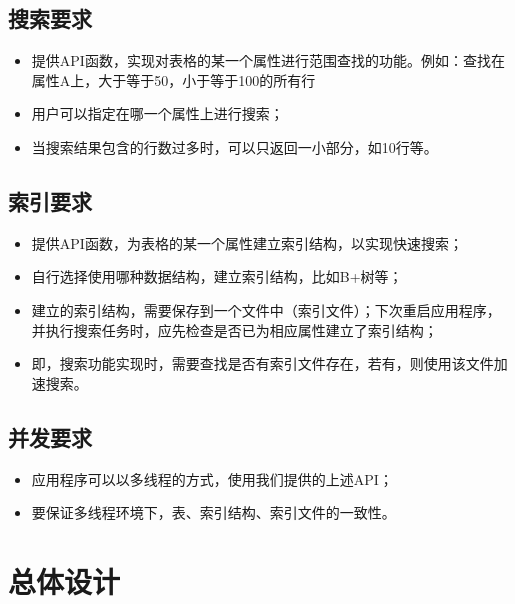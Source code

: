 \documentclass[bachelor]{thesis-uestc}
\begin{document}
\section{搜索要求}
\begin{itemize}
	\item 提供API函数，实现对表格的某一个属性进行范围查找的功能。例如：查找在属性A上，大于等于50，小于等于100的所有行
	\item 用户可以指定在哪一个属性上进行搜索；
	\item 当搜索结果包含的行数过多时，可以只返回一小部分，如10行等。
\end{itemize}

\section{索引要求}
\begin{itemize}
	\item 提供API函数，为表格的某一个属性建立索引结构，以实现快速搜索；
	\item 自行选择使用哪种数据结构，建立索引结构，比如B+树等；
	\item 建立的索引结构，需要保存到一个文件中（索引文件）；下次重启应用程序，并执行搜索任务时，应先检查是否已为相应属性建立了索引结构；
	\item 即，搜索功能实现时，需要查找是否有索引文件存在，若有，则使用该文件加速搜索。	
\end{itemize}

\section{并发要求}
\begin{itemize}
	\item 应用程序可以以多线程的方式，使用我们提供的上述API；
	\item 要保证多线程环境下，表、索引结构、索引文件的一致性。
\end{itemize}

\chapter{总体设计}
\end{document}
